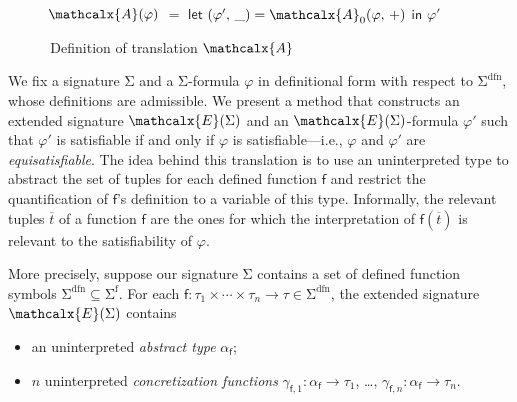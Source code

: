 \documentclass[runningheads,a4paper]{llncs}
\newcommand{\con}[1]{\mathsf{#1}}
\renewcommand\vec[1]{\overline{#1}}
\let\oldSigma=\Sigma
\def\Sigma{\mathrm{\oldSigma}}
\newcommand{\conv}{\mathcalx{A}}
\newcommand{\sfuns}[1]{#1^\mathrm{f}}
\newcommand{\sfundefs}[1]{#1^\mathrm{dfn}}
\newcommand{\ppos}{{+}}
\newcommand\concret{\gamma} %
\newcommand{\farg}[1]{\concret_{#1}}
\newcommand{\fargx}[2]{\concret_{#1,#2}}
\newcommand{\fargtype}[1]{\alpha_{#1}}
\newcommand{\extendsig}[1]{\mathcalx{E}( #1 )}
\begin{document}
\begin{figure}[t]
\begin{enumerate}
\begin{itemize}
\begin{itemize}
   \end{itemize}
 \end{itemize}
\end{enumerate}
\begin{enumerate}
\itemx[\ ]
$\conv( \varphi )$ $=$ $\mathsf{let}$ $( \varphi',\, \_ ) = \conv_0( \varphi,\, \ppos )$ $\mathsf{in}$ $\varphi'$
\\[-1.5\baselineskip] %
\end{enumerate}
\caption{\,Definition of translation $\conv$}
\label{fig:A}
\end{figure}

We fix a signature $\Sigma$ and a $\Sigma$-formula
$\varphi$ in definitional form with respect to $\sfundefs{\Sigma}$,
whose definitions are admissible.
We present a method that constructs an extended signature
$\extendsig{ \Sigma }$ and an $\extendsig{ \Sigma }$-formula $\varphi'$ such that
$\varphi'$ is satisfiable if and only if $\varphi$ is satisfiable---i.e.,
$\varphi$ and $\varphi'$ are \emph{equisatisfiable}.
The idea behind this translation
is to use an uninterpreted type to abstract the set of
 tuples for each defined function $\con{f}$ and restrict the
quantification of $\con{f}$'s definition to a variable of this
type. Informally, the relevant tuples $\vec t$ of a function $\con{f}$ are the
ones for which the interpretation of $\con{f}( \vec t )$ is relevant to the
satisfiability of $\varphi$.

More precisely,
suppose our signature $\Sigma$ contains a set of defined function symbols $\sfundefs{\Sigma} \subseteq \sfuns{\Sigma}$.
For each $\con{f} : \tau_1 \times \cdots \times \tau_n \rightarrow \tau \in \sfundefs{\Sigma}$,
the extended signature $\extendsig{\Sigma}$ contains
\begin{itemize}
\item an uninterpreted \emph{abstract type} $\fargtype{\con{f}}$;
\item $n$ uninterpreted \emph{concretization functions} $\fargx{\con{f}}{1} : \fargtype{\con{f}} \rightarrow \tau_1$, \ldots, $\fargx{\con{f}}{n} : \fargtype{\con{f}} \rightarrow \tau_n$.
\end{itemize}
\end{document}
